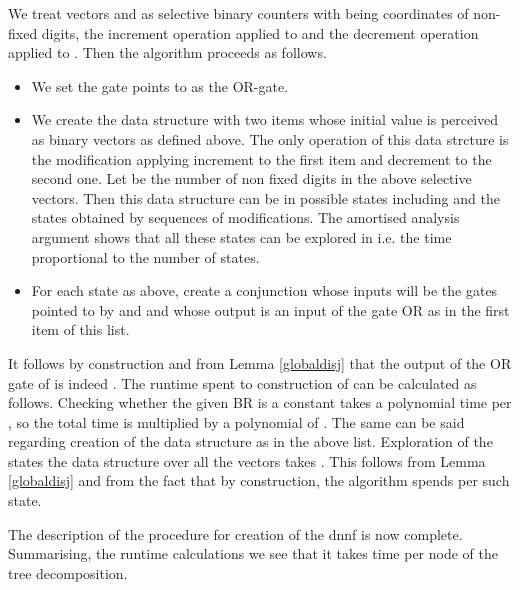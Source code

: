 \documentclass{llncs}
\begin{document}
We treat vectors  and  as selective binary counters with  being
coordinates of non-fixed digits, the increment operation applied to  and the decrement operation applied to .
Then the algorithm proceeds as follows.
\begin{itemize}
\item We set the gate  points to as the OR-gate.
\item We create the data structure with two items whose initial value is  perceived as
      binary vectors as defined above. The only operation of this data strcture is the modification
      applying increment to the first item and decrement to the second one.
      Let  be the number of non fixed digits in the above selective vectors.
      Then this data structure can be in  possible states including  and the states obtained
      by sequences of modifications. The amortised analysis argument shows that all these states can be
      explored in  i.e. the time proportional to the number of states.
\item For each state  as above, create a conjunction whose inputs will be the gates
      pointed to by  and  and whose output is an input of the gate OR
      as in the first item of this list.       
\end{itemize} 
It follows by construction and from Lemma \ref{globaldisj} that the output of the OR gate of 
is indeed . The runtime spent to construction of  can be calculated as follows.
Checking whether the given BR is a  constant takes a polynomial time per , so the total time 
is  multiplied by a polynomial
of . The same can be said regarding creation of the data structure as in the above list. 
Exploration of the states the data structure over all the vectors  takes . This follows from
Lemma \ref{globaldisj} and from the fact that by construction, the algorithm spends  per such state.

The description of the procedure for creation of the {\sc dnnf} is now complete. Summarising, the runtime
calculations we see that it takes  time per node of the tree decomposition.
\end{document}
